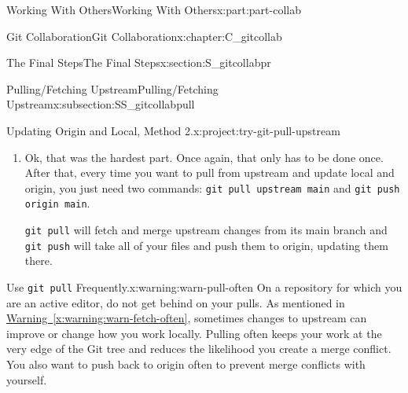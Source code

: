 \documentclass[oneside,10pt,]{book}
\newcommand{\xreffont}{\relax}
\newcommand{\mono}[1]{\texttt{#1}}
\newcommand{\initialism}[1]{\textsc{\MakeLowercase{#1}}}
\begin{document}
\begin{partptx}{Working With Others}{}{Working With Others}{}{}{x:part:part-collab}
\begin{chapterptx}{Git Collaboration}{}{Git Collaboration}{}{}{x:chapter:C_gitcollab}
\begin{sectionptx}{The Final Steps}{}{The Final Steps}{}{}{x:section:S_gitcollabpr}
\begin{subsectionptx}{Pulling\slash{}Fetching Upstream}{}{Pulling\slash{}Fetching Upstream}{}{}{x:subsection:SS_gitcollabpull}
\begin{project}{Updating Origin and Local, Method 2.}{x:project:try-git-pull-upstream}
\begin{enumerate}[font=\bfseries,label=(\alph*),ref=\alph*]
\begin{console}{0}{1}{0}
Please make sure you have the correct access rights
and the repository exists.
\end{console}
%
\par
This is troublesome! Clearly upstream exists; how else would we have forked it? To fix this, you need to manually set the remote connection. Again, this only has to be done once per forked\slash{}cloned repo.%
\begin{enumerate}[font=\bfseries,label=(\roman*),ref=\theenumi.\roman*]
\item{}Navigate to the authoritative repo's homepage and copy its \initialism{HTTPS} clone link, just as if you were going to clone the repo.%
\item{}Head back to your terminal and use \mono{git remote add upstream <https-link>}. There will be no output.%
\item{}Verify that it worked with \mono{git remote -v}. This will print out the HTTPS links for origin and upstream. Make sure your username is on the origin remotes and the official repo\slash{}username is on the upstream remotes.%
\end{enumerate}
\item{}Ok, that was the hardest part. Once again, that only has to be done once. After that, every time you want to pull from upstream and update local and origin, you just need two commands: \mono{git pull upstream main} and \mono{git push origin main}.%
\par
\mono{git pull} will fetch and merge upstream changes from its main branch and \mono{git push} will take all of your files and push them to origin, updating them there.%
\end{enumerate}
\end{project}%
\begin{warning}{Use \mono{git pull} Frequently.}{x:warning:warn-pull-often}%
On a repository for which you are an active editor, do not get behind on your pulls. As mentioned in \hyperref[x:warning:warn-fetch-often]{Warning~{\xreffont\ref{x:warning:warn-fetch-often}}}, sometimes changes to upstream can improve or change how you work locally. Pulling often keeps your work at the very edge of the Git tree and reduces the likelihood you create a merge conflict. You also want to push back to origin often to prevent merge conflicts with yourself.%
\end{warning}
\end{subsectionptx}
\end{sectionptx}
%
%
\typeout{************************************************}

\end{chapterptx}
\end{partptx}
\end{document}
